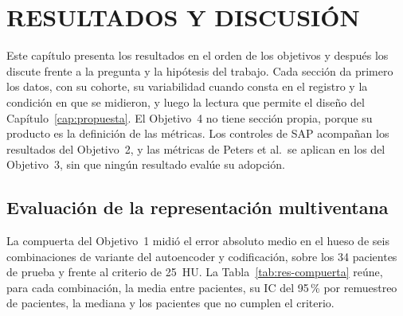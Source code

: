 \chapter{RESULTADOS Y DISCUSIÓN}\label{cap:resultados}

Este capítulo presenta los resultados en el orden de los objetivos y después los discute frente a la pregunta y la hipótesis del trabajo. Cada sección da primero los datos, con su cohorte, su variabilidad cuando consta en el registro y la condición en que se midieron, y luego la lectura que permite el diseño del Capítulo~\ref{cap:propuesta}. El Objetivo~4 no tiene sección propia, porque su producto es la definición de las métricas. Los controles de SAP acompañan los resultados del Objetivo~2, y las métricas de Peters et al.\ se aplican en los del Objetivo~3, sin que ningún resultado evalúe su adopción.

\section{Evaluación de la representación multiventana}\label{sec:res-obj1}

La compuerta del Objetivo~1 midió el error absoluto medio en el hueso de seis combinaciones de variante del autoencoder y codificación, sobre los 34 pacientes de prueba y frente al criterio de 25~HU. La Tabla~\ref{tab:res-compuerta} reúne, para cada combinación, la media entre pacientes, su IC del 95\,\% por remuestreo de pacientes, la mediana y los pacientes que no cumplen el criterio.

